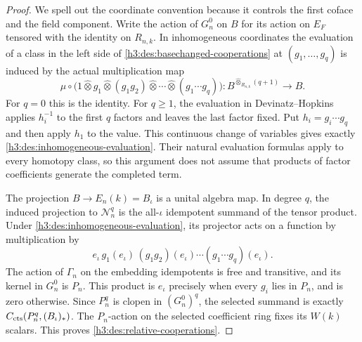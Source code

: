 \begin{proof}
We spell out the coordinate convention because it controls the first
coface and the field component.  Write the action of \(G_n^0\) on
\(B\) for its action on \(E_F\) tensored with the identity on
\(R_{n,k}\).  In inhomogeneous coordinates the evaluation of a class
in the left side of \eqref{h3:des:basechanged-cooperations} at
\((g_1,\ldots,g_q)\) is induced by the actual multiplication map
\begin{equation}\label{h3:des:inhomogeneous-evaluation}
 \mu\circ\bigl(1\widehat\otimes g_1\widehat\otimes
       (g_1g_2)\widehat\otimes\cdots\widehat\otimes
       (g_1\cdots g_q)\bigr):
 B^{\widehat\otimes_{R_{n,k}}(q+1)}\longrightarrow B.
\end{equation}
For \(q=0\) this is the identity.  For \(q\geq1\), the evaluation in
Devinatz--Hopkins applies
\(h_i^{-1}\) to the first \(q\) factors and leaves the last factor
fixed.  Put \(h_i=g_i\cdots g_q\) and then apply \(h_1\) to the value.
This continuous change of variables gives exactly
\eqref{h3:des:inhomogeneous-evaluation}.  Their natural evaluation
formulas apply to every homotopy class, so this argument does not assume
that products of factor coefficients generate the completed term.

The projection \(B\to E_n(k)=B_\iota\) is a unital algebra map.
In degree \(q\), the induced projection to \(\mathcal N_n^q\) is the
all-\(\iota\) idempotent summand of the tensor product.  Under
\eqref{h3:des:inhomogeneous-evaluation}, its projector acts on a function
by multiplication by
\[
 e_\iota\,g_1(e_\iota)\,(g_1g_2)(e_\iota)\cdots
                 (g_1\cdots g_q)(e_\iota).
\]
The action of \(\Gamma_n\) on the embedding idempotents is free and
transitive, and its kernel in \(G_n^0\) is \(P_n\).  This product is
\(e_\iota\) precisely when every \(g_i\) lies in \(P_n\), and is zero
otherwise.  Since \(P_n^q\) is clopen in \((G_n^0)^q\), the selected
summand is exactly \(C_{\mathrm{cts}}(P_n^q,(B_\iota)_*)\).  The
\(P_n\)-action on the selected coefficient ring fixes its \(W(k)\)
scalars.  This proves \eqref{h3:des:relative-cooperations}.


\end{proof}
